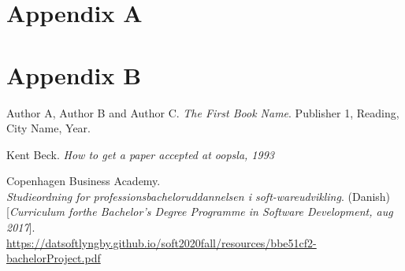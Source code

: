 \documentclass[
english, %
headsepline, %
]{scrartcl} %
\begin{document}
\begin{appendices}
    \section{Appendix A}
    \label{sec:Appendix A}
    \section{Appendix B}
    \label{sec:Appendix B}
    \clearpage
\end{appendices}

\begin{thebibliography}{9}
\label{thebibliography}
    Author A, Author B and Author C. 
    \textit{The First Book Name}. 
    Publisher 1, Reading, City Name, Year.
    
    Kent Beck. 
    \textit{How to get a paper accepted at oopsla, 1993}
    
    Copenhagen Business Academy.\\
    \textit{Studieordning  for  professionsbacheloruddannelsen  i  soft-wareudvikling}. (Danish) 
    [\textit{Curriculum forthe Bachelor’s Degree Programme in Software Development, aug 2017}].
    \\\url{https://datsoftlyngby.github.io/soft2020fall/resources/bbe51cf2-bachelorProject.pdf}
\end{thebibliography}
\end{document}
